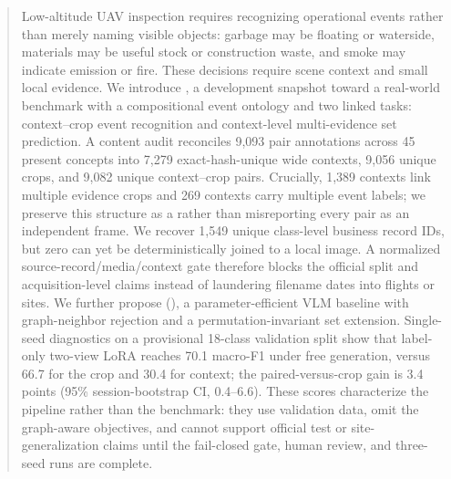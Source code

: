 \begin{abstract}
Low-altitude UAV inspection requires recognizing operational events rather than merely naming visible objects: garbage may be floating or waterside, materials may be useful stock or construction waste, and smoke may indicate emission or fire. These decisions require scene context and small local evidence. We introduce \dataset, a development snapshot toward a real-world benchmark with a compositional event ontology and two linked tasks: context--crop event recognition and context-level multi-evidence set prediction. A content audit reconciles 9,093 pair annotations across 45 present concepts into 7,279 exact-hash-unique wide contexts, 9,056 unique crops, and 9,082 unique context--crop pairs. Crucially, 1,389 contexts link multiple evidence crops and 269 contexts carry multiple event labels; we preserve this structure as a \samplegraph rather than misreporting every pair as an independent frame. We recover 1,549 unique class-level business record IDs, but zero can yet be deterministically joined to a local image. A normalized source-record/media/context gate therefore blocks the official split and acquisition-level claims instead of laundering filename dates into flights or sites. We further propose \methodfull (\method), a parameter-efficient VLM baseline with graph-neighbor rejection and a permutation-invariant set extension. Single-seed diagnostics on a provisional 18-class validation split show that label-only two-view LoRA reaches 70.1 macro-F1 under free generation, versus 66.7 for the crop and 30.4 for context; the paired-versus-crop gain is 3.4 points (95\% session-bootstrap CI, 0.4--6.6). These scores characterize the pipeline rather than the benchmark: they use validation data, omit the graph-aware objectives, and cannot support official test or site-generalization claims until the fail-closed gate, human review, and three-seed runs are complete.
\end{abstract}
